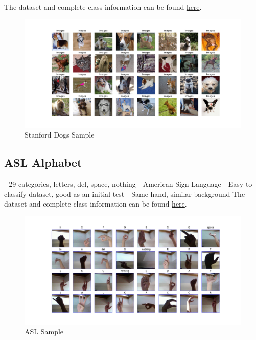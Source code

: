 The dataset and complete class information can be found \href{http://vision.stanford.edu/aditya86/ImageNetDogs/}{here}.
\begin{figure}[H]
    \centering
    \includegraphics[width=1\textwidth]{images/dogs.pdf}
	\caption{Stanford Dogs Sample}
	\label{fig:dogs}
\end{figure}





\subsection{ASL Alphabet}
- 29 categories, letters, del, space, nothing
- American Sign Language
- Easy to classify dataset, good as an initial test
- Same hand, similar background
The dataset and complete class information can be found \href{https://www.kaggle.com/datasets/grassknoted/asl-alphabet}{here}.
\begin{figure}[H]
	\centering
	\includegraphics[width=1\textwidth]{images/asl.pdf}
	\caption{ASL Sample}
	\label{fig:asl}

\end{figure}


